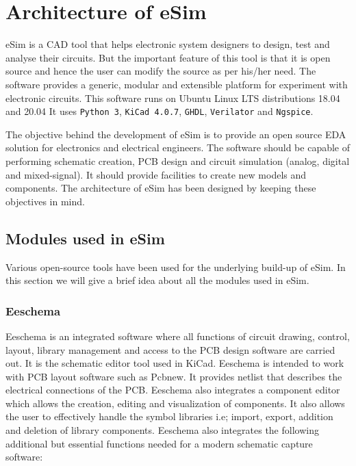 
\chapter {Architecture of eSim}
\thispagestyle{empty}
\label{chap2}

eSim is a CAD  tool that helps electronic system designers
to design, test and analyse their circuits. But the important feature
of this tool is that it is open source and hence the user can modify
the source as per his/her need. The software provides a generic,
modular and extensible platform for experiment with electronic
circuits. This software runs on Ubuntu Linux LTS distributions 18.04 and 20.04 %
It uses {\tt Python 3}, {\tt KiCad 4.0.7},
{\tt GHDL}, {\tt Verilator}
and 
{\tt Ngspice}.

The objective behind the development of eSim is to provide an open
source EDA solution for electronics and electrical engineers. The 
software should be capable of performing schematic creation, PCB 
design and circuit simulation (analog, digital and mixed-signal). 
It should provide facilities to create new models and components. 
The architecture of eSim has been designed by keeping these 
objectives in mind. 

\section {Modules used in eSim}
Various open-source tools have been used for the underlying build-up 
of eSim. In this section we will give a brief idea about all the modules 
used in eSim. 

\subsection {Eeschema}  
Eeschema is an integrated software where all functions of circuit
drawing, control, layout, library management and access to the PCB
design software are carried out.  It is the schematic
editor tool used in KiCad. %
Eeschema is intended to
work with PCB layout software such as Pcbnew. It provides netlist that
describes the electrical connections of the PCB. Eeschema also
integrates a component editor which allows the creation, editing and
visualization of components. It also allows the user to effectively
handle the symbol libraries i.e; import, export, addition and deletion
of library components.  Eeschema also integrates the following
additional but essential functions needed for a modern schematic
capture software:

